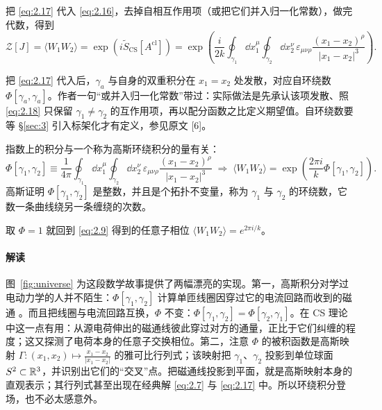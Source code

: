 把 \eqref{eq:2.17} 代入 \eqref{eq:2.16}，去掉自相互作用项（或把它们并入归一化常数），做完代数，得到
\begin{equation}\tag{2.18}\label{eq:2.18}
  \mathcal{Z}[J] = \langle W_1W_2\rangle = \exp\left(i\widetilde{S}_{\mathrm{CS}}[A^{\mathrm{cl}}]\right)
  = \exp\left(\frac{i}{2k}\oint_{\gamma_1}\dd x_1^\mu\oint_{\gamma_2}\dd x_2^\nu\,\varepsilon_{\mu\nu\rho}\frac{(x_1-x_2)^\rho}{|x_1-x_2|^3}\right).
\end{equation}

\begin{yizhu}[含糊点]
把 \eqref{eq:2.17} 代入后，$\gamma_a$ 与自身的双重积分在 $x_1=x_2$ 处发散，对应自环绕数 $\Phi[\gamma_a,\gamma_a]$。作者一句“或并入归一化常数”带过：实际做法是先承认该项发散、照 \eqref{eq:2.18} 只保留 $\gamma_1\neq\gamma_2$ 的互作用项，再以配分函数之比定义期望值。自环绕数要等 \S\ref{sec:3} 引入标架化才有定义，参见原文 [6]。
\end{yizhu}

指数上的积分与一个称为高斯环绕积分的量有关：
\begin{equation}\tag{2.19}\label{eq:2.19}
  \Phi[\gamma_1,\gamma_2] \equiv \frac{1}{4\pi}\oint_{\gamma_1}\dd x_1^\mu\oint_{\gamma_2}\dd x_2^\nu\,\varepsilon_{\mu\nu\rho}\frac{(x_1-x_2)^\rho}{|x_1-x_2|^3}
  \;\Longrightarrow\;
  \langle W_1W_2\rangle = \exp\left(\frac{2\pi i}{k}\Phi[\gamma_1,\gamma_2]\right).
\end{equation}
高斯证明 $\Phi[\gamma_1,\gamma_2]$ 是整数，并且是个拓扑不变量，称为 $\gamma_1$ 与 $\gamma_2$ 的环绕数，它数一条曲线绕另一条缠绕的次数。

取 $\Phi=1$ 就回到 \eqref{eq:2.9} 得到的任意子相位 $\langle W_1W_2\rangle=e^{2\pi i/k}$。

\paragraph{解读} %
图~\ref{fig:universe} 为这段数学故事提供了两幅漂亮的实现。第一，高斯积分对学过电动力学的人并不陌生：$\Phi[\gamma_1,\gamma_2]$ 计算单匝线圈因穿过它的电流回路而收到的磁通 \cite{ricca2011}。而且把线圈与电流回路互换，$\Phi$ 不变：$\Phi[\gamma_1,\gamma_2]=\Phi[\gamma_2,\gamma_1]$。在 CS 理论中这一点有用：从源电荷伸出的磁通线彼此穿过对方的通量，正比于它们纠缠的程度；这又探测了电荷本身的任意子交换相位。第二，注意 $\Phi$ 的被积函数是高斯映射 $\Gamma:(x_1,x_2)\mapsto\frac{x_1-x_2}{|x_1-x_2|}$ 的雅可比行列式；该映射把 $\gamma_1$、$\gamma_2$ 投影到单位球面 $S^2\subset\mathbb{R}^3$，并识别出它们的“交叉”点。把磁通线投影到平面，就是高斯映射本身的直观表示；其行列式甚至出现在经典解 \eqref{eq:2.7} 与 \eqref{eq:2.17} 中。所以环绕积分登场，也不必太感意外。

